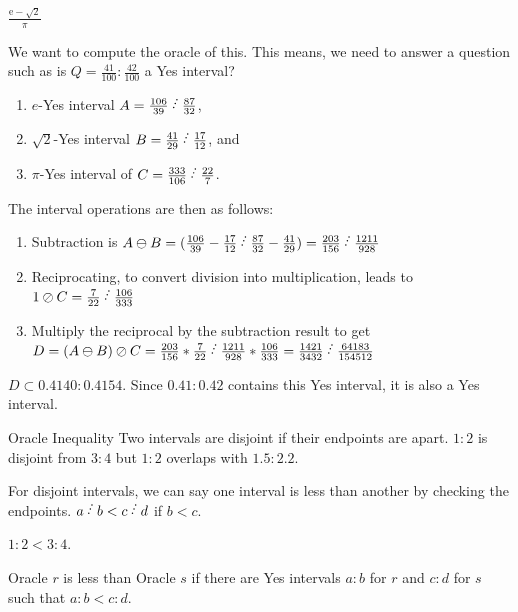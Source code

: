 \documentclass{beamer}
\begin{document}
\begin{frame}{$\frac{\mathrm{e} - \sqrt{2}}{\pi}$}

    We want to compute the oracle of this. This means, we need to answer a question such as is $Q = \frac{41}{100}: \frac{42}{100}$ a Yes interval?

\begin{enumerate}
\item $e$-Yes interval $A  = \frac{106}{39} \lte \frac{87}{32}$,
\item $\sqrt{2}$-Yes interval $B = \frac{41}{29} \lte \frac{17}{12}$, and
\item $\pi$-Yes interval of $C= \frac{333}{106} \lte \frac{22}{7}$.
\end{enumerate}
The interval operations are then as follows:
\begin{enumerate}
\item Subtraction is $A\ominus B = (\frac{106}{39} - \frac{17}{12} \lte \frac{87}{32} - \frac{41}{29}) = \frac{203}{156} \lte \frac{1211}{928}$ 
\item Reciprocating, to convert division into multiplication, leads to  $1\oslash C = \frac{7}{22} \lte \frac{106}{333}$
\item Multiply the reciprocal by the subtraction result to get $D = (A\ominus B)\oslash C = \frac{203}{156} *\frac{7}{22} \lte \frac{1211}{928} * \frac{106}{333} = \frac{1421}{3432} \lte \frac{64183}{154512}$
\end{enumerate}

$D \subset 0.4140: 0.4154$. Since $0.41:0.42$ contains this Yes interval, it is also a Yes interval.  
    
\end{frame}


\begin{frame}{Oracle Inequality}
    Two intervals are disjoint if their endpoints are apart.  $1:2$ is disjoint from $3:4$ but $1:2$ overlaps with $1.5:2.2$.

    For disjoint intervals, we can say one interval is less than another by checking the endpoints. $a\lte b < c \lte d$ if $b<c$.

    $1:2 < 3:4$.

    Oracle $r$ is less than Oracle $s$ if there are Yes intervals $a:b$ for $r$ and $c:d$ for $s$ such that $a:b < c:d$.

\end{frame}
\end{document}
